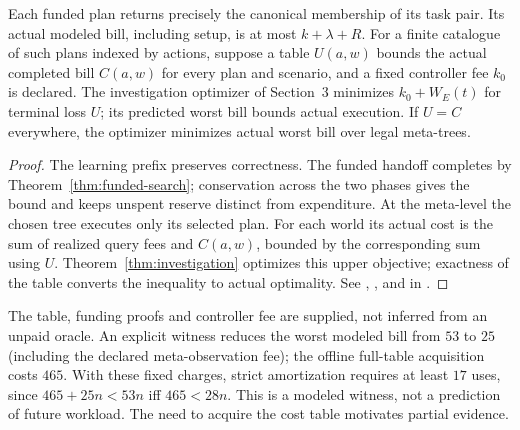 \begin{theorem}\label{thm:meta-selection}
Each funded plan returns precisely the canonical membership of its task pair. Its actual modeled bill, including setup, is at most $k+\lambda+R$. For a finite catalogue of such plans indexed by actions, suppose a table $U(a,w)$ bounds the actual completed bill $C(a,w)$ for every plan and scenario, and a fixed controller fee $k_0$ is declared. The investigation optimizer of Section~3 minimizes $k_0+W_E(t)$ for terminal loss $U$; its predicted worst bill bounds actual execution. If $U=C$ everywhere, the optimizer minimizes actual worst bill over legal meta-trees.
\end{theorem}
\begin{proof}
The learning prefix preserves correctness. The funded handoff completes by Theorem~\ref{thm:funded-search}; conservation across the two phases gives the bound and keeps unspent reserve distinct from expenditure. At the meta-level the chosen tree executes only its selected plan. For each world its actual cost is the sum of realized query fees and $C(a,w)$, bounded by the corresponding sum using $U$. Theorem~\ref{thm:investigation} optimizes this upper objective; exactness of the table converts the inequality to actual optimality. See , ,  and  in .
\end{proof}
The table, funding proofs and controller fee are supplied, not inferred from an unpaid oracle. An explicit witness reduces the worst modeled bill from $53$ to $25$ (including the declared meta-observation fee); the offline full-table acquisition costs $465$. With these fixed charges, strict amortization requires at least $17$ uses, since $465+25n<53n$ iff $465<28n$. This is a modeled witness, not a prediction of future workload. The need to acquire the cost table motivates partial evidence.


